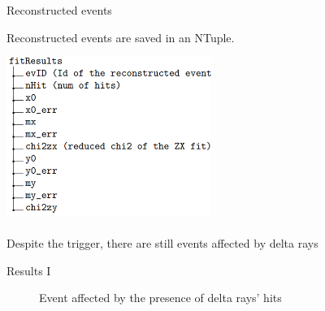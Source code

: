 \documentclass[8pt]{beamer}
\begin{document}
\begin{frame}{Reconstructed events}
    
Reconstructed events are saved in an NTuple.
    
\begin{center}
           \includegraphics[width=0.5\textwidth]{img/fitres.png}
           \\
           \vspace{0.4cm}
           \\
           \vspace{0.2cm}
           Despite the trigger, there are still events affected by delta rays
\end{center}


    
    
\end{frame}

\begin{frame}[fragile]{Results I}

\begin{figure}[h!]
    \centering
    \caption{Event affected by the presence of delta rays' hits}
    \label{fig:bad}
\end{figure}



    
\end{frame}
\end{document}
